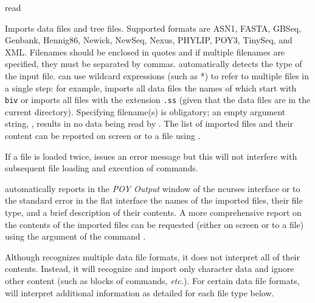 \begin{command}{read}{}


	\begin{poydescription} 
        Imports data files and tree files.  Supported formats are ASN1, FASTA,
        GBSeq, Genbank, Hennig86, Newick, NewSeq, Nexus, PHYLIP, POY3,
        TinySeq, and XML. Filenames should be enclosed in quotes and if multiple
        filenames are specified, they must be separated by commas.
         automatically detects the type of the input file.
         can use wildcard expressions (such as *) to
        refer to multiple files in a single step: for example,  imports all data files the names of which start
        with \texttt{biv} or  imports all files with
        the extension \texttt{.ss} (given that the data files are in the current directory).
        Specifying filename(s) is
        obligatory; an empty argument string, , results in no
        data being read by \poy. The list of imported files and their content
        can be reported on screen or to a file using .
        
        If a file is loaded twice, \poy issues an error message but this will not
        interfere with subsequent file loading and execution of commands.
        
       \poy automatically reports in the \emph{POY Output} window of the ncurses
            interface or to the standard error in the flat interface the names
            of the imported files, their file type, and a brief description of
            their contents. A more comprehensive report on the contents of the imported
            files can be requested (either on screen or to a file) using the argument
             of the command .

        \begin{statement}
            Although \poy recognizes multiple data file formats, it does not
            interpret all of their contents. Instead, it will recognize and import
            only character data and ignore other content (such as blocks of
            commands, \emph{etc.}). For certain data file formats, \poy will interpret
            additional information as detailed for each file type below.
        \end{statement}
        

\end{poydescription}
\end{command}
